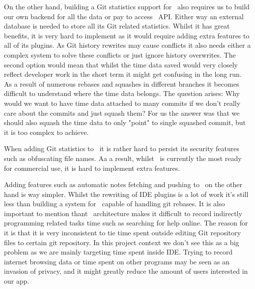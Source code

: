 On the other hand, building a Git statistics support for~ also requires us to build our own backend
for all the data or pay to access~ API. %
Either way an external database is needed to store all its Git related statistics.
Whilst it has great benefits, it is very hard to implement as it would require adding extra features to all of its plugins.
As Git history rewrites may cause conflicts it also needs either a complex system to solve these conflicts or just ignore history overwrites.
The second option would mean that whilst the time data saved would very closely reflect developer work in the short term it might get
confusing in the long run.
As a result of numerous rebases and squashes in different branches it becomes difficult to understand where the time data belongs.
The question arises: Why would we want to have time data attached to many commits if we don't really care about the commits and just squash them?
For us the answer was that we should also squash the time data to only "point" to single squashed commit, but it is too complex to achieve.

When adding Git statistics to~ it is rather hard to persist its security features such as obfuscating file names.
Aa a result, whilst~ is currently the most ready for commercial use, it is hard to implement extra features.

Adding features such as automatic notes fetching and pushing to~ on the other hand is way simpler.
Whilst the rewriting of IDE plugins is a lot of work it's still less than building a system for~ capable of handling git rebases.
It is also important to mention thant~ architecture makes it difficult to record indirectly programming related tasks time
such as searching for help online.
The reason for it is that it is very inconsistent to tie time spent outside editing Git repository files to certain git repository.
In this project context we don't see this as a big problem as we are mainly targeting time spent inside IDE.
Trying to record internet browsing data or time spent on other programs may be seen as an invasion of privacy,
and it might greatly reduce the amount of users interested in our app.
